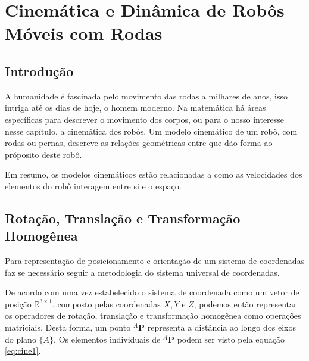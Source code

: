 \chapter{Cinemática e Dinâmica de Robôs Móveis com Rodas}


\section{Introdução}\label{intro}

A humanidade é fascinada pelo movimento das rodas a milhares de anos, isso intriga até os dias de hoje, o homem moderno.
Na matemática há áreas específicas para descrever o movimento dos corpos, ou para o nosso interesse nesse capítulo, a cinemática dos robôs. 
Um modelo cinemático de um robô, com rodas ou pernas, descreve as relações geométricas entre que dão forma ao próposito deste robô.

Em resumo, os modelos cinemáticos estão relacionadas a como as velocidades dos elementos do robô interagem entre si e o espaço.

\section{Rotação, Translação e Transformação Homogênea}\label{rotacao}
 
Para representação de posicionamento e orientação de um sistema de coordenadas faz se necessário seguir a metodologia do sistema universal de coordenadas.

De acordo com \cite{craig2009introduction} uma vez estabelecido o sistema de coordenada como um vetor de posição $\mathbb{R}^{3 \times 1}$, composto pelas coordenadas $X,Y$ e $Z$, podemos então representar os operadores de rotação, translação e transformação homogênea como operações matriciais. Desta forma, um ponto ${}^A\mathbf{P}$ representa a distância ao longo dos eixos do plano $\{A\}$. Os elementos individuais de ${}^A\mathbf{P}$ podem ser visto pela equação \eqref{eq:cine1}.

